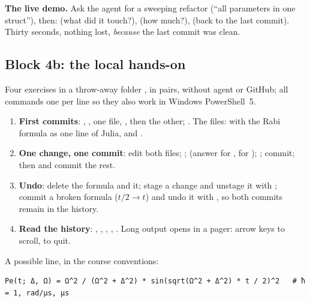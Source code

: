 \textbf{The live demo.} Ask the agent for a sweeping refactor (``all parameters in one
struct''), then:  (what did it touch?),  (how
much?),  (back to the last commit). Thirty seconds, nothing lost,
\emph{because} the last commit was clean.

\subsection{Block 4b: the local hands-on}

Four exercises in a throw-away folder , in pairs, without agent or
GitHub; all commands one per line so they also work in Windows PowerShell~5.
{\raggedright
\begin{enumerate}
  \item \textbf{First commits}: , ,  one file,
        , then the other; . The files: 
        with the Rabi formula as one line of Julia, and .
  \item \textbf{One change, one commit}: edit both files; ;
         (answer  for ,  for );
        ; commit; then  and commit the rest.
  \item \textbf{Undo}: delete the formula and  it; stage a change and
        unstage it with ; commit a broken formula
        ($t/2 \to t$) and undo it with , so both commits
        remain in the history.
  \item \textbf{Read the history}: , ,
        , , .
        Long output opens in a pager: arrow keys to scroll,  to quit.
\end{enumerate}\par}
A possible  line, in the course conventions:
\begin{lstlisting}
Pe(t; Δ, Ω) = Ω^2 / (Ω^2 + Δ^2) * sin(sqrt(Ω^2 + Δ^2) * t / 2)^2   # ħ = 1, rad/μs, μs
\end{lstlisting}

